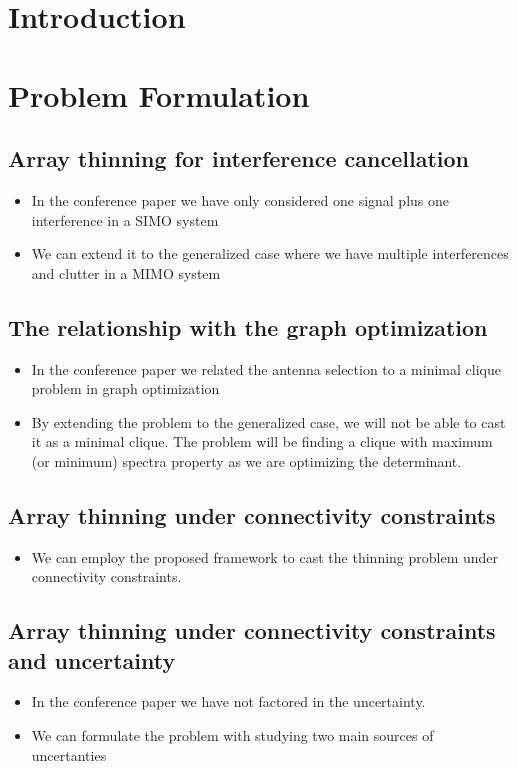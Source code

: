 \documentclass[journal]{IEEEtran}
\begin{document}
\section{Introduction}\label{intro}

\section{Problem Formulation }\label{sec:framework}


\subsection{Array thinning for interference cancellation} 
\begin{itemize}
    \item In the conference paper we have only considered one signal plus one interference in a SIMO system   
\item We can extend it to the generalized case where we have multiple interferences and clutter in  a MIMO system
\end{itemize}
\subsection{The relationship with the graph optimization} 
\begin{itemize}
    \item In the conference paper we related the antenna selection to a minimal clique problem in graph optimization
\item By extending the problem to the generalized case, we will not be able to cast it as a minimal clique. The problem will be finding a clique with maximum (or minimum) spectra property as we are optimizing the determinant. 
\end{itemize}
\subsection{Array thinning under connectivity constraints} 
\begin{itemize}
    \item  We can employ the proposed framework to cast the thinning problem under connectivity constraints. 
\end{itemize}
\subsection{Array thinning under connectivity constraints and uncertainty} 
\begin{itemize}
    \item  In the conference paper we have not factored in the uncertainty.
    \item We can formulate the problem with studying two main sources of uncertanties
\end{itemize}
\end{document}
